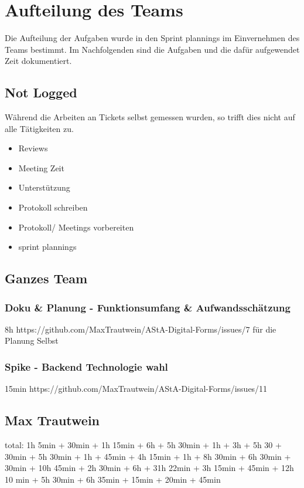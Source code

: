 \chapter{Aufteilung des Teams}\label{ch:aufteilung-des-teams}
Die Aufteilung der Aufgaben wurde in den Sprint plannings im Einvernehmen des Teams bestimmt.
Im Nachfolgenden sind die Aufgaben und die dafür aufgewendet Zeit dokumentiert.

\section{Not Logged}
Während die Arbeiten an Tickets selbst gemessen wurden, so trifft dies nicht auf alle Tätigkeiten zu.

\begin{itemize}
    \item Reviews
    \item Meeting Zeit
    \item Unterstützung
    \item Protokoll schreiben
    \item Protokoll/ Meetings vorbereiten
    \item sprint plannings
\end{itemize}

\section{Ganzes Team}

\subsection{Doku & Planung - Funktionsumfang & Aufwandsschätzung}
8h
https://github.com/MaxTrautwein/AStA-Digital-Forms/issues/7
für die Planung Selbst

\subsection{Spike - Backend Technologie wahl }
15min
https://github.com/MaxTrautwein/AStA-Digital-Forms/issues/11

\section{Max Trautwein}\label{sec:max-trautwein}

total: 1h 5min + 30min + 1h 15min + 6h + 5h 30min + 1h + 3h + 5h 30 + 30min + 5h 30min + 1h + 45min + 4h 15min + 1h
+ 8h 30min + 6h 30min + 30min + 10h 45min + 2h 30min + 6h + 31h 22min + 3h 15min + 45min + 12h 10 min + 5h 30min + 6h 35min
+ 15min + 20min + 45min

